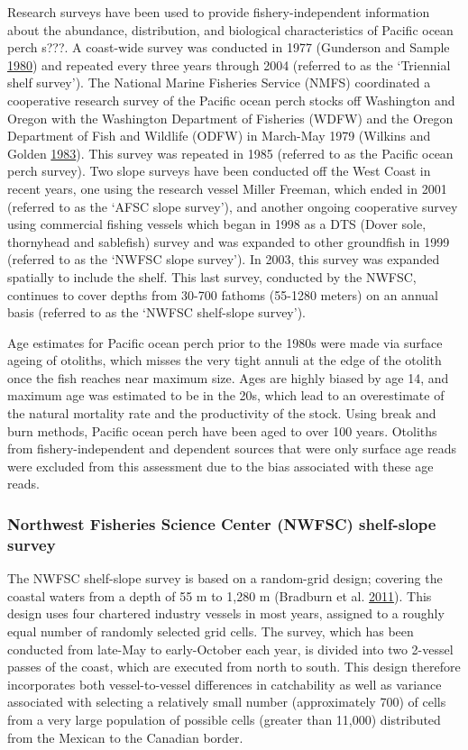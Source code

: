 \documentclass[12pt,]{article}
\begin{document}
Research surveys have been used to provide fishery-independent
information about the abundance, distribution, and biological
characteristics of Pacific ocean perch s???. A coast-wide survey was
conducted in 1977 (Gunderson and Sample
\protect\hyperlink{ref-gunderson_distribution_1980}{1980}) and repeated
every three years through 2004 (referred to as the `Triennial shelf
survey'). The National Marine Fisheries Service (NMFS) coordinated a
cooperative research survey of the Pacific ocean perch stocks off
Washington and Oregon with the Washington Department of Fisheries (WDFW)
and the Oregon Department of Fish and Wildlife (ODFW) in March-May 1979
(Wilkins and Golden
\protect\hyperlink{ref-wilkins_condition_1983}{1983}). This survey was
repeated in 1985 (referred to as the Pacific ocean perch survey). Two
slope surveys have been conducted off the West Coast in recent years,
one using the research vessel Miller Freeman, which ended in 2001
(referred to as the `AFSC slope survey'), and another ongoing
cooperative survey using commercial fishing vessels which began in 1998
as a DTS (Dover sole, thornyhead and sablefish) survey and was expanded
to other groundfish in 1999 (referred to as the `NWFSC slope survey').
In 2003, this survey was expanded spatially to include the shelf. This
last survey, conducted by the NWFSC, continues to cover depths from
30-700 fathoms (55-1280 meters) on an annual basis (referred to as the
`NWFSC shelf-slope survey').

Age estimates for Pacific ocean perch prior to the 1980s were made via
surface ageing of otoliths, which misses the very tight annuli at the
edge of the otolith once the fish reaches near maximum size. Ages are
highly biased by age 14, and maximum age was estimated to be in the 20s,
which lead to an overestimate of the natural mortality rate and the
productivity of the stock. Using break and burn methods, Pacific ocean
perch have been aged to over 100 years. Otoliths from
fishery-independent and dependent sources that were only surface age
reads were excluded from this assessment due to the bias associated with
these age reads.

\subsubsection{Northwest Fisheries Science Center (NWFSC) shelf-slope
survey}\label{northwest-fisheries-science-center-nwfsc-shelf-slope-survey}

The NWFSC shelf-slope survey is based on a random-grid design; covering
the coastal waters from a depth of 55 m to 1,280 m (Bradburn et al.
\protect\hyperlink{ref-bradburn_2003_2011}{2011}). This design uses four
chartered industry vessels in most years, assigned to a roughly equal
number of randomly selected grid cells. The survey, which has been
conducted from late-May to early-October each year, is divided into two
2-vessel passes of the coast, which are executed from north to south.
This design therefore incorporates both vessel-to-vessel differences in
catchability as well as variance associated with selecting a relatively
small number (approximately 700) of cells from a very large population
of possible cells (greater than 11,000) distributed from the Mexican to
the Canadian border.
\end{document}
